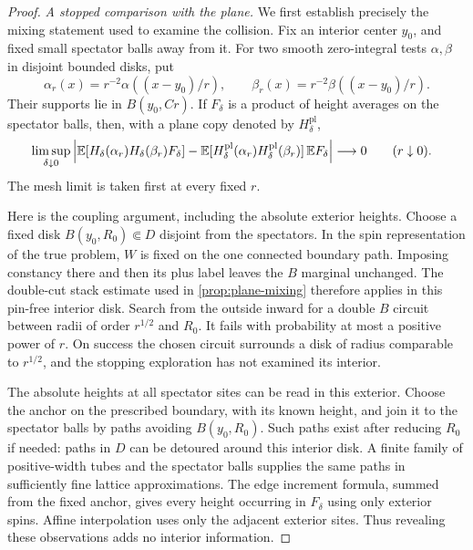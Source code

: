 \begin{proof}
\emph{A stopped comparison with the plane.}
We first establish precisely the mixing statement used to examine
the collision. Fix an interior center $y_0$, and fixed small
spectator balls away from it. For two smooth zero-integral tests
$\alpha,\beta$ in disjoint bounded disks, put
\[
 \alpha_r(x)=r^{-2}\alpha((x-y_0)/r),\qquad
 \beta_r(x)=r^{-2}\beta((x-y_0)/r).
\]
Their supports lie in $B(y_0,Cr)$. If $F_\delta$ is a product of
height averages on the spectator balls, then, with a plane copy
denoted by $H_\delta^{\mathrm{pl}}$,
\begin{align}
 &\limsup_{\delta\downarrow0}
 \left|\mathbb E[H_\delta(\alpha_r)H_\delta(\beta_r)F_\delta]
    -\mathbb E[H_\delta^{\mathrm{pl}}(\alpha_r)
                 H_\delta^{\mathrm{pl}}(\beta_r)]\,\mathbb E F_\delta\right|
       \longrightarrow0\qquad(r\downarrow0).
 \label{eq:local-product-mixing}
\end{align}
The mesh limit is taken first at every fixed $r$.

Here is the coupling argument, including the absolute exterior
heights. Choose a fixed disk $B(y_0,R_0)\Subset D$ disjoint from
the spectators. In the spin representation of the true problem,
$W$ is fixed on the one connected boundary path. Imposing constancy
there and then its plus label leaves the $B$ marginal unchanged.
The double-cut stack estimate used in \cref{prop:plane-mixing}
therefore applies in this pin-free interior disk. Search from the
outside inward for a double $B$ circuit between radii of order
$r^{1/2}$ and $R_0$. It fails with probability at most a positive
power of $r$. On success the chosen circuit surrounds a disk of
radius comparable to $r^{1/2}$, and the stopping exploration has
not examined its interior.

The absolute heights at all spectator sites can be read in this
exterior. Choose the anchor on the prescribed boundary, with its
known height, and join it to the spectator balls by paths avoiding
$B(y_0,R_0)$. Such paths exist after reducing $R_0$ if needed:
paths in $D$ can be detoured around this interior disk. A finite
family of positive-width tubes and the spectator balls supplies
the same paths in sufficiently fine lattice approximations. The
edge increment formula, summed from the fixed anchor, gives every
height occurring in $F_\delta$ using only exterior spins. Affine
interpolation uses only the adjacent exterior sites. Thus revealing
these observations adds no interior information.


\end{proof}

